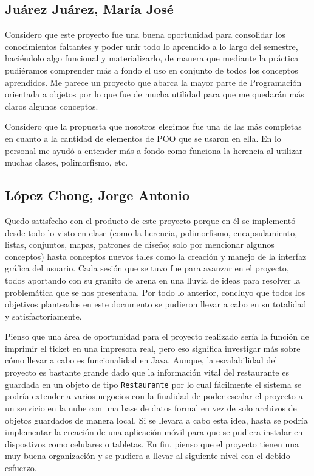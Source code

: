 \newpage

\subsection*{Juárez Juárez, María José}
Considero que este proyecto fue una buena oportunidad para consolidar los conocimientos faltantes y 
poder unir todo lo aprendido a lo largo del semestre, haciéndolo algo funcional y materializarlo, de 
manera que mediante la práctica pudiéramos comprender más a fondo el uso en conjunto de todos los 
conceptos aprendidos. 
Me parece un proyecto que abarca la mayor parte de Programación orientada a 
objetos por lo que fue de mucha utilidad para que me quedarán más claros algunos conceptos. 


Considero que la propuesta que nosotros elegimos fue una de las más completas en cuanto 
a la cantidad de elementos de POO que se usaron en ella. 
En lo personal me ayudó a entender más a fondo como funciona la herencia al utilizar 
muchas clases, polimorfismo, etc.


\newpage

\subsection*{López Chong, Jorge Antonio}
Quedo satisfecho con el producto de este proyecto porque en él se implementó desde todo lo visto en clase
(como la herencia, polimorfismo, encapsulamiento, listas, conjuntos, mapas, patrones de diseño; solo por
mencionar algunos conceptos) hasta conceptos nuevos tales como la creación y manejo de la interfaz
gráfica del usuario. Cada sesión que se tuvo fue para avanzar en el proyecto, todos aportando con su granito
de arena en una lluvia de ideas para resolver la problemática que se nos presentaba. Por todo lo anterior,
concluyo que todos los objetivos planteados en este documento se pudieron llevar a cabo en su totalidad y
satisfactoriamente.

Pienso que una área de oportunidad para el proyecto realizado sería la función de imprimir el ticket en una
impresora real, pero eso significa investigar más sobre cómo llevar a cabo es funcionalidad en Java. Aunque,
la escalabilidad del proyecto es bastante grande dado que la información vital del restaurante es guardada
en un objeto de tipo \texttt{Restaurante} por lo cual fácilmente el sistema se podría extender a varios
negocios con la finalidad de poder escalar el proyecto a un servicio en la nube con una base de datos formal
en vez de solo archivos de objetos guardados de manera local. Si se llevara a cabo esta idea, hasta se podría
implementar la creación de una aplicación móvil para que se pudiera instalar en dispostivos como celulares o
tabletas. En fin, pienso que el proyecto tienen una muy buena organización y se pudiera a llevar al siguiente
nivel con el debido esfuerzo.

